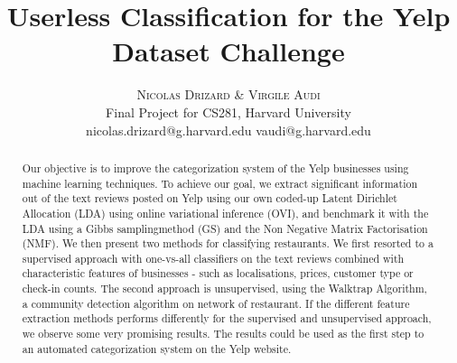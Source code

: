 \documentclass[twoside]{article}
\title{\vspace{-15mm}\fontsize{24pt}{10pt}\selectfont\textbf{Userless Classification for the Yelp Dataset Challenge}} %
\author{
\large
\textsc{Nicolas Drizard \& Virgile Audi}\\[2mm] %
\normalsize Final Project for CS281, Harvard University \\ %
\normalsize {nicolas.drizard@g.harvard.edu \quad vaudi@g.harvard.edu} %
\vspace{-5mm}
}
\date{}
\begin{document}
\maketitle %

\thispagestyle{fancy} %


\begin{abstract}

\noindent

Our objective is to improve the categorization system of the Yelp businesses using machine learning techniques. To achieve our goal, we extract significant information out of the text reviews posted on Yelp using our own coded-up Latent Dirichlet Allocation (LDA) using online variational inference (OVI), and benchmark it with the LDA using a Gibbs samplingmethod (GS) and the Non Negative Matrix Factorisation (NMF). We then present two methods for classifying restaurants. We first resorted to a supervised approach with one-vs-all classifiers on  the text reviews combined with characteristic features of businesses - such as localisations, prices, customer type or check-in counts. The second approach is unsupervised, using the Walktrap Algorithm, a community detection algorithm on network of restaurant. If the different feature extraction methods performs differently for the supervised and unsupervised approach, we observe some very promising results. The results could be used as the first step to an automated categorization system on the Yelp website. 

\end{abstract}

\end{document}
